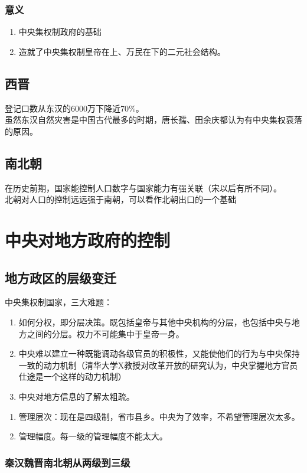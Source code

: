 \documentclass[twoside]{article}
\begin{document}
\subsubsection{意义}
\begin{enumerate}
\item 中央集权制政府的基础
\item 造就了中央集权制皇帝在上、万民在下的二元社会结构。
\end{enumerate}
\subsection{西晋}
登记口数从东汉的6000万下降近70\%。\\
虽然东汉自然灾害是中国古代最多的时期，唐长孺、田余庆都认为有中央集权衰落的原因。
\subsection{南北朝}
在历史前期，国家能控制人口数字与国家能力有强关联（宋以后有所不同）。\\
北朝对人口的控制远远强于南朝，可以看作北朝出口的一个基础
\section{中央对地方政府的控制}
\subsection{地方政区的层级变迁}
中央集权制国家，三大难题：
\begin{enumerate}
	\item 如何分权，即分层决策。既包括皇帝与其他中央机构的分层，也包括中央与地方之间的分层。权力不可能集中于皇帝一身。
	\item 中央难以建立一种既能调动各级官员的积极性，又能使他们的行为与中央保持一致的动力机制（清华大学X教授对改革开放的研究认为，中央掌握地方官员仕途是一个这样的动力机制）
	\item 中央对地方信息的了解太粗疏。
\end{enumerate}
\begin{enumerate}
\item 管理层次：现在是四级制，省市县乡。中央为了效率，不希望管理层次太多。
\item 管理幅度。每一级的管理幅度不能太大。
\end{enumerate}
\subsubsection{秦汉魏晋南北朝从两级到三级}
\end{document}

